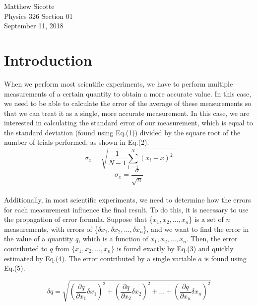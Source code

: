 \documentclass[leqno]{article}
\begin{document}
\begin{flushright}
Matthew Sicotte\\
Physics 326 Section 01\\
September 11, 2018
\end{flushright}
\section*{Introduction}
When we perform most scientific experiments, we have to perform multiple measurements of a certain quantity to obtain a more accurate value.  In this case, we need to be able to calculate the error of the average of these measurements so that we can treat it as a single, more accurate measurement.  In this case, we are interested in calculating the standard error of our measurement, which is equal to the standard deviation (found using Eq.(1)) divided by the square root of the number of trials performed, as shown in Eq.(2).  %
\begin{equation}
	\sigma_x=\sqrt{\frac{1}{N-1}\sum_{i=1}^{N} (x_i-\bar{x})^2}
\end{equation}
\begin{equation}
	\sigma_{\bar{x}}=\frac{\sigma}{\sqrt{n}}
\end{equation}\\

Additionally, in most scientific experiments, we need to determine how the errors for each measurement influence the final result.  To do this, it is necessary to use the propagation of error formula.  Suppose that \{$x_1, x_2, \ldots, x_n$\} is a set of $n$ measurements, with errors of \{$\delta x_1, \delta x_2, \ldots, \delta x_n$\}, and we want to find the error in the value of a quantity $q$, which is a function of $x_1, x_2, \ldots, x_n$.  Then, the error contributed to $q$ from \{$x_1, x_2, \ldots, x_n$\} is found exactly by Eq.(3) and quickly estimated by Eq.(4).  The error contributed by a single variable $a$ is found using Eq.(5). 

\begin{equation}
	\delta q=\sqrt{(\frac{\partial q}{\partial x_1}\delta x_1)^2+(\frac{\partial q}{\partial x_2}\delta x_2)^2+\ldots+(\frac{\partial q}{\partial x_n}\delta x_n)^2}
\end{equation}
\end{document}

